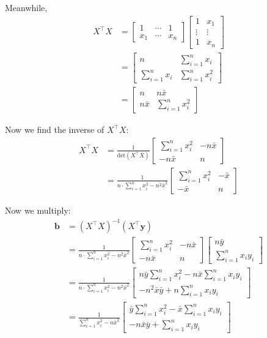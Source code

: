 \documentclass[12pt]{article}
\begin{document}
\begin{enumerate}
Meanwhile,
\begin{align*}
	X^\top X
	&=\begin{bmatrix}
		1 & \cdots & 1\\
		x_1 & \cdots & x_n
	\end{bmatrix}
	\begin{bmatrix}
		1 & x_1\\
		\vdots & \vdots\\
		1 & x_n
	\end{bmatrix}\\
	&=\begin{bmatrix}
		n & \sum_{i=1}^{n}x_i\\
		\sum_{i=1}^{n}x_i & \sum_{i=1}^{n}x_i^2
	\end{bmatrix}\\
	&=\begin{bmatrix}
		n & n\bar{x}\\
		n\bar{x} & \sum_{i=1}^{n}x_i^2
	\end{bmatrix}
\end{align*}

Now we find the inverse of $X^\top X$:
\begin{align*}
	X^\top X
	&= \frac{1}{\text{det}(X^\top X)}
	\begin{bmatrix}
		\sum_{i=1}^{n}x_i^2 & -n\bar{x}\\
		-n\bar{x} & n
	\end{bmatrix}\\
	&=\frac{1}{n\cdot \sum_{i=1}^{n}x_i^2-n^2\bar{x}^2}
	\begin{bmatrix}
		\sum_{i=1}^{n}x_i^2 & -\bar{x}\\
		-\bar{x} & n
	\end{bmatrix}
\end{align*}

Now we multiply:
\begin{align*}
	\mathbf{b} &= (X^\top X)^{-1}(X^\top \mathbf{y})\\
	&=\frac{1}{n\cdot \sum_{i=1}^{n}x_i^2-n^2\bar{x}^2}
	\begin{bmatrix}
		\sum_{i=1}^{n}x_i^2 & -n\bar{x}\\
		-n\bar{x} & n
	\end{bmatrix}
	\begin{bmatrix}
		n\bar{y}\\
		\sum_{i=1}^{n}x_iy_i
	\end{bmatrix}\\
	&=\frac{1}{n\cdot \sum_{i=1}^{n}x_i^2-n^2\bar{x}^2}
	\begin{bmatrix}
		n\bar{y}\sum_{i=1}^{n}x_i^2-n\bar{x}\sum_{i=1}^{n}x_iy_i\\
		-n^2\bar{x}\bar{y}+n\sum_{i=1}^{n}x_iy_i
	\end{bmatrix}\\
	&=\frac{1}{ \sum_{i=1}^{n}x_i^2-n\bar{x}^2}
	\begin{bmatrix}
		\bar{y}\sum_{i=1}^{n}x_i^2-\bar{x}\sum_{i=1}^{n}x_iy_i\\
		-n\bar{x}\bar{y}+\sum_{i=1}^{n}x_iy_i
	\end{bmatrix}\\
\end{align*}


\end{enumerate}
\end{document}
